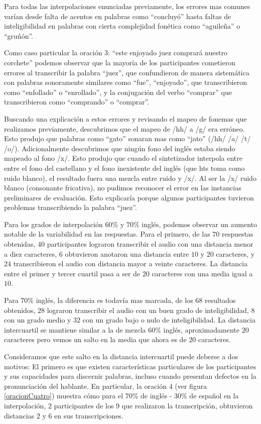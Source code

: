 Para todas las interpolaciones enunciadas previamente, los errores mas comunes varían desde falta de acentos en palabras como ``concluyó'' hasta faltas de inteligibilidad en palabras con cierta complejidad fonética como ``aguileña'' o ``gruñón''.

Como caso particular la oración $3$: ``este enjoyado juez comprará nuestro corchete'' podemos observar que la mayoría de los participantes cometieron errores al transcribir la palabra ``juez'', que confundieron de manera sistemática con palabras sonoramente similares como ``fue'', ``enjoyado'', que transcribieron como ``enfollado'' o ``enrollado'', y la conjugación del verbo ``comprar'' que transcribieron como ``comprando'' o ``comprar''.

Buscando una explicación a estos errores y revisando el mapeo de fonemas que realizamos previamente, descubrimos que el mapeo de /hh/ a /g/ era erróneo. Esto produjo que palabras como ``gato'' sonaran mas como ``jato'' (/hh/ /a/ /t/ /o/). Adicionalmente descubrimos que ningún fono del inglés estaba siendo mapeado al fono /x/. Esto produjo que cuando el sintetizador interpola entre entre el fono del castellano y el fono inexistente del inglés (que hts toma como ruido blanco), el resultado fuera una mezcla entre ruido y /x/. Al ser la /x/ ruido blanco (consonante fricativa), no pudimos reconocer el error en las instancias preliminares de evaluación. Esto explicaría porque algunos participantes tuvieron problemas transcribiendo la palabra ``juez''.

Para los grados de interpolación $60\%$ y $70\%$ inglés, podemos observar un aumento notable de la variabilidad en las respuestas. Para el primero, de las $70$ respuestas obtenidas, $40$ participantes lograron transcribir el audio con una distancia menor a diez caracteres, $6$ obtuvieron anotaron una distancia entre $10$ y $20$ caracteres, y $24$ transcribieron el audio con distancia mayor a veinte caracteres. La distancia entre el primer y tercer cuartil pasa a ser de $20$ caracteres con una media igual a $10$.

Para $70\%$ inglés, la diferencia es todavía mas marcada, de los $68$ resultados obtenidos, $28$ lograron transcribir el audio con un buen grado de inteligibilidad, $8$ con un grado medio y $32$ con un grado bajo o nulo de inteligibilidad. La distancia intercuartil se mantiene similar a la de mezcla $60\%$ inglés, aproximadamente $20$ caracteres pero vemos un salto en la media que ahora es de $20$ caracteres.

Consideramos que este salto en la distancia intercuartil puede deberse a dos motivos: El primero es que existen características particulares de los participantes y sus capacidades para discernir palabras, incluso cuando presentan defectos en la pronunciación del hablante. En particular, la oración $4$ (ver figura \ref{oracionCuatro}) muestra cómo para el $70\%$ de inglés - $30\%$ de español en la interpolación, $2$ participantes de los $9$ que realizaron la transcripción, obtuvieron distancias $2$ y $6$ en sus transcripciones.

